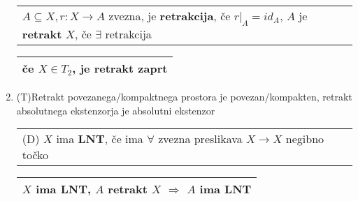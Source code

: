 \documentclass[10pt,a4paper]{article}
\begin{document}
\begin{enumerate}
    \setlength\itemsep{3px}%
    

\vspace{-2mm}
\begin{table}[htbp]
    \begin{tabular}{p{14cm}}
        $A \subseteq X, r: X \rightarrow A$ zvezna, je \textbf{retrakcija}, če $r|_A = id_A$, $A$ je \textbf{retrakt} $X$, če $\exists$ retrakcija \\
    \end{tabular}
    \begin{tabular}{|l|}
        \hline
        če $X \in T_2$, je retrakt zaprt \\
        \hline
    \end{tabular}
\end{table}
\vspace{-4.5mm}

\item (T)Retrakt povezanega/kompaktnega prostora je povezan/kompakten, retrakt absolutnega ekstenzorja je absolutni ekstenzor


\vspace{-3mm}
\begin{table}[htbp]
    \begin{tabular}{p{11.8cm}}
        (D) \(X\) ima \textbf{LNT}, če ima \(\forall\) zvezna preslikava \(X \rightarrow X\) negibno točko \\ 
    \end{tabular}    
    \begin{tabular}{|l|}
        \hline
        $X$ ima LNT, $A$ retrakt $X$ $\Rightarrow$ $A$ ima LNT \\
        \hline
    \end{tabular}
\end{table}
\vspace{-4mm}



\end{enumerate}
\end{document}
